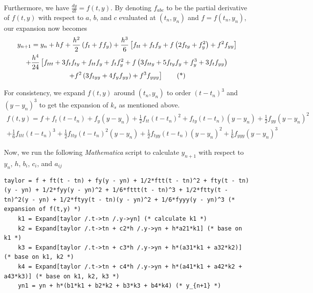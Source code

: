 \documentclass[a4paper]{article}
\begin{document}
Furthermore, we have \(\frac{dy}{dt} = f(t,y)\). By denoting \(f_{abc}\) to be the partial derivative of \(f(t,y)\) with respect to \(a\), \(b\), and \(c\) evaluated at \((t_n, y_n)\) and \(f = f(t_n, y_n)\), our expansion now becomes
\begin{multline*}
  y_{n+1} = y_n + hf + \frac{h^2}{2}\left(f_t + f f_y\right) + \frac{h^3}{6}\left[f_{tt} + f_t f_y + f\left(2f_{ty} + f_y^2\right) + f^2 f_{yy}\right] \\
  + \frac{h^4}{24}\left[f_{ttt} + 3f_t f_{ty} + f_{tt} f_y + f_t f_y^2 + f\left(3f_{tty} + 5f_{ty} f_y + f_y^3 + 3f_t f_{yy}\right)\right.     \\
    \left.+ f^2\left(3f_{tyy} + 4f_y f_{yy}\right) + f^3 f_{yyy}\vphantom{f_y^3}\right] \tag{*}
\end{multline*}

For consistency, we expand \(f(t,y)\) around \((t_n, y_n)\) to order \({(t-t_n)}^3\) and \({(y-y_n)}^3\) to get the expansion of \(k_s\) as mentioned above.
\begin{multline*}
  f(t,y) = f + f_t(t-t_n) + f_y(y-y_n) + \frac{1}{2}f_{tt}{(t-t_n)}^2 + f_{ty}(t-t_n)(y-y_n) + \frac{1}{2}f_{yy}{(y-y_n)}^2                        \\
  + \frac{1}{6}f_{ttt}{(t-t_n)}^3 + \frac{1}{2}f_{tty}{(t-t_n)}^2(y-y_n) + \frac{1}{2}f_{tyy}(t-t_n){(y-y_n)}^2 + \frac{1}{6}f_{yyy}{(y-y_n)}^3
\end{multline*}

Now, we run the following \textit{Mathematica} script to calculate \(y_{n+1}\) with respect to \(y_n\), \(h\), \(b_i\), \(c_i\), and \(a_{ij}\)
\begin{mdframed}[hidealllines=true,backgroundcolor=magenta!10]
  \begin{lstlisting}[language=myMMA]
    taylor = f + ft(t - tn) + fy(y - yn) + 1/2*ftt(t - tn)^2 + fty(t - tn)(y - yn) + 1/2*fyy(y - yn)^2 + 1/6*fttt(t - tn)^3 + 1/2*ftty(t - tn)^2(y - yn) + 1/2*ftyy(t - tn)(y - yn)^2 + 1/6*fyyy(y - yn)^3 (* expansion of f(t,y) *)
    k1 = Expand[taylor /.t->tn /.y->yn] (* calculate k1 *)
    k2 = Expand[taylor /.t->tn + c2*h /.y->yn + h*a21*k1] (* base on k1 *)
    k3 = Expand[taylor /.t->tn + c3*h /.y->yn + h*(a31*k1 + a32*k2)] (* base on k1, k2 *)
    k4 = Expand[taylor /.t->tn + c4*h /.y->yn + h*(a41*k1 + a42*k2 + a43*k3)] (* base on k1, k2, k3 *)
    yn1 = yn + h*(b1*k1 + b2*k2 + b3*k3 + b4*k4) (* y_{n+1} *)
  \end{lstlisting}
\end{mdframed}
\end{document}
